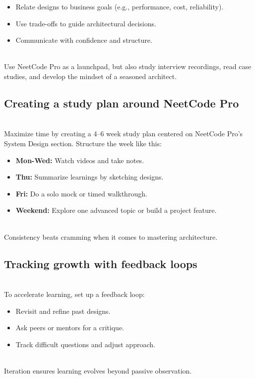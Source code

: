 \begin{itemize}
\item
\protect{}\label{VjEHCbXwzPx5RXIoMnv3k}
Relate designs to business goals (e.g., performance, cost, reliability).
\item
\protect{}\label{gsjhBnzISfhtA-bp8ljcq}
Use trade-offs to guide architectural decisions.
\item
\protect{}\label{5lqt_agidtQ_HHdaoFSh-}
Communicate with confidence and structure.
\end{itemize}
\\
Use NeetCode Pro as a launchpad, but also study interview recordings, read case studies, and develop the mindset of a seasoned architect.

\subsection{Creating a study plan around NeetCode Pro}\label{QnGRLcBq6CD-sMMrpktvU}
\\
Maximize time by creating a 4--6 week study plan centered on NeetCode Pro's System Design section. Structure the week like this:

\begin{itemize}
\item
\protect{}\label{SXXvaJb0qgb-1XVqLVJHW}
\textbf{Mon-Wed:} Watch videos and take notes.
\item
\protect{}\label{v2fJ1BEXmFQA1Yggukqi-}
\textbf{Thu:} Summarize learnings by sketching designs.
\item
\protect{}\label{_TeQqQlqfOw00zJYk6Ryp}
\textbf{Fri:} Do a solo mock or timed walkthrough.
\item
\protect{}\label{D2oY7dK8EUm31vpOE5FiP}
\textbf{Weekend:} Explore one advanced topic or build a project feature.
\end{itemize}
\\
Consistency beats cramming when it comes to mastering architecture.

\subsection{Tracking growth with feedback loops}\label{IP_oWAItPQn7Qkkv65zRs}
\\
To accelerate learning, set up a feedback loop:

\begin{itemize}
\item
\protect{}\label{hIWVo9myOcJ2qQAa9vpZl}
Revisit and refine past designs.
\item
\protect{}\label{I0vcGCWDN5B6zss52DNLK}
Ask peers or mentors for a critique.
\item
\protect{}\label{IBv3RidDkQbTgmKfcJnGk}
Track difficult questions and adjust approach.
\end{itemize}
\\
Iteration ensures learning evolves beyond passive observation.

